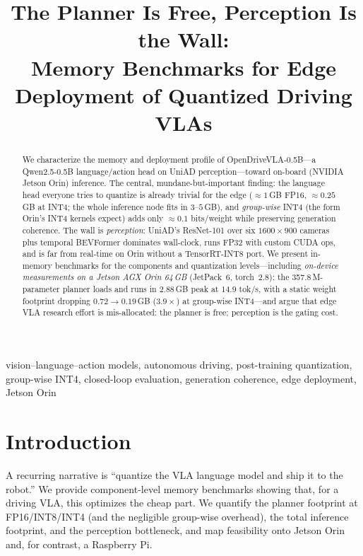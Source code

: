 \documentclass[conference]{IEEEtran}
\title{\textbf{The Planner Is Free, Perception Is the Wall:\\
Memory Benchmarks for Edge Deployment of Quantized Driving VLAs}}
\author{\IEEEauthorblockN{Justin Williams, Kishor Datta Gupta, Roy George, Mrinmoy Sarkar}
\IEEEauthorblockA{Clark Atlanta University \\ \texttt{justinwilliamstech693@gmail.com}}}
\begin{document}
\maketitle

\begin{abstract}
We characterize the memory and deployment profile of OpenDriveVLA-0.5B---a Qwen2.5-0.5B
language/action head on UniAD perception---toward on-board (NVIDIA Jetson Orin) inference. The
central, mundane-but-important finding: the language head everyone tries to quantize is already
trivial for the edge ($\approx 1$\,GB FP16, $\approx 0.25$\,GB at INT4; the whole inference node
fits in $3$--$5$\,GB), and \emph{group-wise} INT4 (the form Orin's INT4 kernels expect) adds only
$\approx 0.1$ bits/weight while preserving generation coherence. The wall is \emph{perception}:
UniAD's ResNet-101 over six $1600\times900$ cameras plus temporal BEVFormer dominates wall-clock,
runs FP32 with custom CUDA ops, and is far from real-time on Orin without a TensorRT-INT8 port. We
present in-memory benchmarks for the components and quantization levels---including \emph{on-device
measurements on a Jetson AGX Orin 64\,GB} (JetPack~6, torch~2.8): the 357.8\,M-parameter planner
loads and runs in $2.88$\,GB peak at $14.9$ tok/s, with a static weight footprint dropping
$0.72\to 0.19$\,GB ($3.9\times$) at group-wise INT4---and argue that edge VLA
research effort is mis-allocated: the planner is free; perception is the gating cost.
\end{abstract}
\begin{IEEEkeywords}
vision--language--action models, autonomous driving, post-training quantization, group-wise INT4, closed-loop evaluation, generation coherence, edge deployment, Jetson Orin
\end{IEEEkeywords}

\section{Introduction}
A recurring narrative is ``quantize the VLA language model and ship it to the robot.'' We provide
component-level memory benchmarks showing that, for a driving VLA, this optimizes the cheap part.
We quantify the planner footprint at FP16/INT8/INT4 (and the negligible group-wise overhead), the
total inference footprint, and the perception bottleneck, and map feasibility onto Jetson Orin and,
for contrast, a Raspberry Pi.
\end{document}
